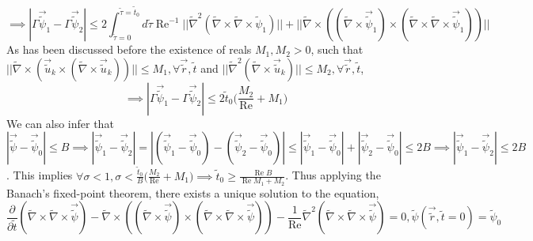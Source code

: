 \documentclass{article}
\begin{document}
\begin{equation*}
\implies |\Gamma\vec{\tilde{\psi}}_1 - \Gamma\vec{\tilde{\psi}}_2| \le 2 \int_{\tilde{\tau}=0}^{\tilde{\tau} = \tilde{t}_0} d\tilde{\tau} \operatorname{Re}^{-1} \bigg|\bigg|\tilde{\nabla}^2(\tilde{\nabla}\times\tilde{\nabla}
\times\tilde{\psi}_1)\bigg|\bigg| + \bigg|\bigg|\tilde{\nabla} \times ((\tilde{\nabla} \times \vec{\tilde{\psi}}_1)\times(\tilde{\nabla} \times \tilde{\nabla} \times \vec{\tilde{\psi}}_1))\bigg|\bigg|
\end{equation*}
As has been discussed before the existence of reals $M_1, M_2 > 0$, such that $\bigg|\bigg|\tilde{\nabla} \times (\vec{\tilde{u}}_k\times(\tilde{\nabla} \times \vec{\tilde{u}}_k))\bigg|\bigg| \le M_1, \forall \vec{\tilde{r}}, \tilde{t}$ and $\bigg|\bigg|\tilde{\nabla}^2(\tilde{\nabla}\times\vec{\tilde{u}}_k)\bigg|\bigg| \le M_2, \forall \vec{\tilde{r}}, \tilde{t}$,
\begin{equation*}
\implies |\Gamma\vec{\tilde{\psi}}_1 - \Gamma\vec{\tilde{\psi}}_2| \le 2 \tilde{t}_0 \bigg(\frac{M_2}{\operatorname{Re}}+M_1\bigg)
\end{equation*}
We can also infer that $|\vec{\tilde{\psi}}-\vec{\tilde{\psi}}_0|\le B \implies |\vec{\tilde{\psi}}_1-\vec{\tilde{\psi}}_2| = |(\vec{\tilde{\psi}}_1-\vec{\tilde{\psi}}_0)-(\vec{\tilde{\psi}}_2-\vec{\tilde{\psi}}_0)| \le |\vec{\tilde{\psi}}_1-\vec{\tilde{\psi}}_0|+|\vec{\tilde{\psi}}_2-\vec{\tilde{\psi}}_0| \le 2B \implies |\vec{\tilde{\psi}}_1-\vec{\tilde{\psi}}_2| \le 2B$. This implies $\forall \sigma < 1, \sigma < \frac{\tilde{t}_0}{B}\bigg(\frac{M_2}{\operatorname{Re}}+M_1\bigg) \implies \tilde{t}_0 \ge \frac{\operatorname{Re} B}{\operatorname{Re} M_1 + M_2}$.  Thus applying the Banach's fixed-point theorem, there exists a unique solution to the equation,
\begin{equation*}
\frac{\partial}{\partial \tilde{t}}(\tilde{\nabla}\times\tilde{\nabla}\times\vec{\tilde{\psi}}) - \tilde{\nabla} \times ((\tilde{\nabla} \times \vec{\tilde{\psi}})\times(\tilde{\nabla} \times \tilde{\nabla} \times \vec{\tilde{\psi}})) - \frac{1}{\operatorname{Re}} \tilde{\nabla}^2(\tilde{\nabla}\times\tilde{\nabla}\times\vec{\tilde{\psi}}) = 0, \tilde{\psi}(\vec{\tilde{r}},\tilde{t} = 0) = \tilde{\psi}_0
\end{equation*}
\end{document}
